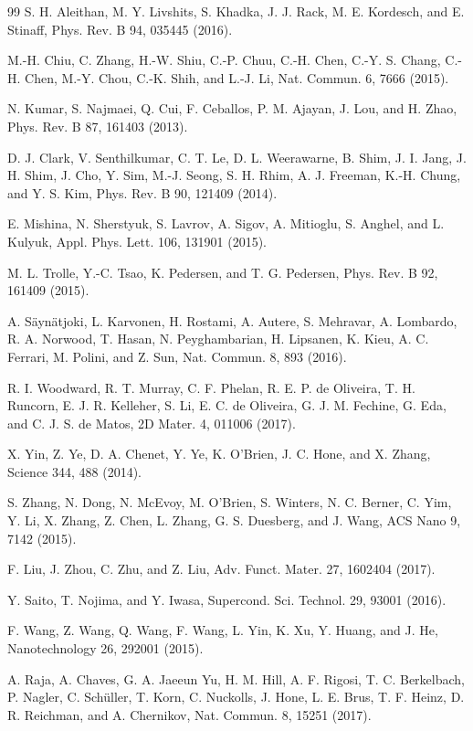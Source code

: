 \documentclass[11pt,a4paper]{ctexart}
\begin{document}
\begin{thebibliography}{99}
 S. H. Aleithan, M. Y. Livshits, S. Khadka, J. J. Rack, M. E. Kordesch, and E. Stinaff, Phys. Rev. B 94, 035445 (2016).

 M.-H. Chiu, C. Zhang, H.-W. Shiu, C.-P. Chuu, C.-H. Chen, C.-Y. S. Chang, C.-H. Chen, M.-Y. Chou, C.-K. Shih, and L.-J. Li, Nat. Commun. 6, 7666 (2015).

 N. Kumar, S. Najmaei, Q. Cui, F. Ceballos, P. M. Ajayan, J. Lou, and H. Zhao, Phys. Rev. B 87, 161403 (2013).

 D. J. Clark, V. Senthilkumar, C. T. Le, D. L. Weerawarne, B. Shim, J. I. Jang, J. H. Shim, J. Cho, Y. Sim, M.-J. Seong, S. H. Rhim, A. J. Freeman, K.-H. Chung, and Y. S. Kim, Phys. Rev. B 90, 121409 (2014).

 E. Mishina, N. Sherstyuk, S. Lavrov, A. Sigov, A. Mitioglu, S. Anghel, and L. Kulyuk, Appl. Phys. Lett. 106, 131901 (2015).

 M. L. Trolle, Y.-C. Tsao, K. Pedersen, and T. G. Pedersen, Phys. Rev. B 92, 161409 (2015).

 A. Säynätjoki, L. Karvonen, H. Rostami, A. Autere, S. Mehravar, A. Lombardo, R. A. Norwood, T. Hasan, N. Peyghambarian, H. Lipsanen, K. Kieu, A. C. Ferrari, M. Polini, and Z. Sun, Nat. Commun. 8, 893 (2016).

 R. I. Woodward, R. T. Murray, C. F. Phelan, R. E. P. de Oliveira, T. H. Runcorn, E. J. R. Kelleher, S. Li, E. C. de Oliveira, G. J. M. Fechine, G. Eda, and C. J. S. de Matos, 2D Mater. 4, 011006 (2017).

 X. Yin, Z. Ye, D. A. Chenet, Y. Ye, K. O’Brien, J. C. Hone, and X. Zhang, Science 344, 488 (2014).

 S. Zhang, N. Dong, N. McEvoy, M. O’Brien, S. Winters, N. C. Berner, C. Yim, Y. Li, X. Zhang, Z. Chen, L. Zhang, G. S. Duesberg, and J. Wang, ACS Nano 9, 7142 (2015).

 F. Liu, J. Zhou, C. Zhu, and Z. Liu, Adv. Funct. Mater. 27, 1602404 (2017).

 Y. Saito, T. Nojima, and Y. Iwasa, Supercond. Sci. Technol. 29, 93001 (2016).

 F. Wang, Z. Wang, Q. Wang, F. Wang, L. Yin, K. Xu, Y. Huang, and J. He, Nanotechnology 26, 292001 (2015).

 A. Raja, A. Chaves, G. A. Jaeeun Yu, H. M. Hill, A. F. Rigosi, T. C. Berkelbach, P. Nagler, C. Schüller, T. Korn, C. Nuckolls, J. Hone, L. E. Brus, T. F. Heinz, D. R. Reichman, and A. Chernikov, Nat. Commun. 8, 15251 (2017).


\end{thebibliography}
\end{document}
